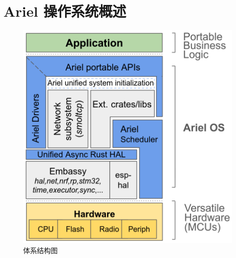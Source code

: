 \section{Ariel 操作系统概述 %
}\label{sec:user-guide}

 \begin{figure}[t!]
     \centering
     \includegraphics[width=0.7\linewidth]{translate/figures/arch-diagram-v4.png}
     \caption{\OSname{} 体系结构图%
     }
     \label{fig:ariel-arch}
 \end{figure}
 

